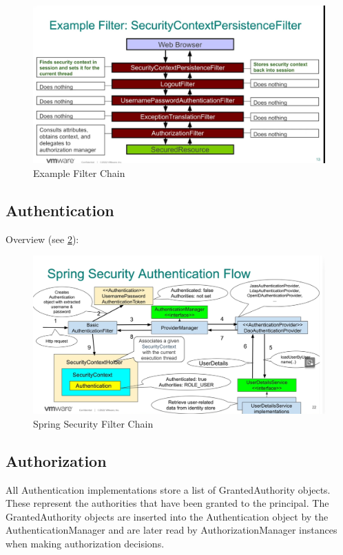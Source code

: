 \documentclass{scrartcl}
\begin{document}
\begin{figure}
    \centering
    \includegraphics[width=1\linewidth]{filter-chain-example}
    \caption{Example Filter Chain}
    \label{fig:filter-chain-example}
\end{figure}

\subsection{Authentication}

Overview (see \ref{fig:authentication}):

\begin{figure}
    \centering
    \includegraphics[width=1\linewidth]{authentication}
    \caption{Spring Security Filter Chain}
    \label{fig:authentication}
\end{figure}
\subsection{Authorization}

All Authentication implementations store a list of GrantedAuthority objects. These represent the authorities that have been granted to the principal. The GrantedAuthority objects are inserted into the Authentication object by the AuthenticationManager and are later read by AuthorizationManager instances when making authorization decisions.
\end{document}
